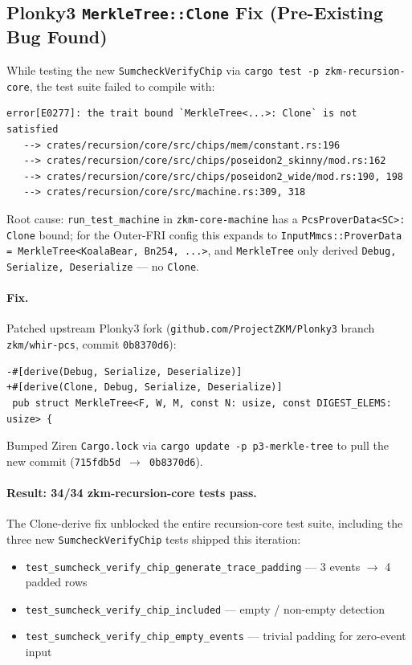 \subsection{Plonky3 \texttt{MerkleTree::Clone} Fix
            (Pre-Existing Bug Found)}

While testing the new \texttt{SumcheckVerifyChip} via
\texttt{cargo test -p zkm-recursion-core}, the test suite failed to
compile with:

\begin{verbatim}
error[E0277]: the trait bound `MerkleTree<...>: Clone` is not satisfied
   --> crates/recursion/core/src/chips/mem/constant.rs:196
   --> crates/recursion/core/src/chips/poseidon2_skinny/mod.rs:162
   --> crates/recursion/core/src/chips/poseidon2_wide/mod.rs:190, 198
   --> crates/recursion/core/src/machine.rs:309, 318
\end{verbatim}

Root cause: \texttt{run\_test\_machine} in \texttt{zkm-core-machine}
has a \texttt{PcsProverData<SC>: Clone} bound; for the Outer-FRI
config this expands to
\texttt{InputMmcs::ProverData = MerkleTree<KoalaBear, Bn254, ...>},
and \texttt{MerkleTree} only derived \texttt{Debug, Serialize,
Deserialize} --- no \texttt{Clone}.

\paragraph{Fix.}
Patched upstream Plonky3 fork
(\texttt{github.com/ProjectZKM/Plonky3} branch
\texttt{zkm/whir-pcs}, commit \texttt{0b8370d6}):

\begin{verbatim}
-#[derive(Debug, Serialize, Deserialize)]
+#[derive(Clone, Debug, Serialize, Deserialize)]
 pub struct MerkleTree<F, W, M, const N: usize, const DIGEST_ELEMS: usize> {
\end{verbatim}

Bumped Ziren \texttt{Cargo.lock} via \texttt{cargo update -p
p3-merkle-tree} to pull the new commit (\texttt{715fdb5d $\to$
0b8370d6}).

\paragraph{Result: 34/34 zkm-recursion-core tests pass.}
The Clone-derive fix unblocked the entire recursion-core test
suite, including the three new \texttt{SumcheckVerifyChip} tests
shipped this iteration:
\begin{itemize}
  \item \texttt{test\_sumcheck\_verify\_chip\_generate\_trace\_padding}
        --- 3 events $\to$ 4 padded rows
  \item \texttt{test\_sumcheck\_verify\_chip\_included} ---
        empty / non-empty detection
  \item \texttt{test\_sumcheck\_verify\_chip\_empty\_events} ---
        trivial padding for zero-event input
\end{itemize}

